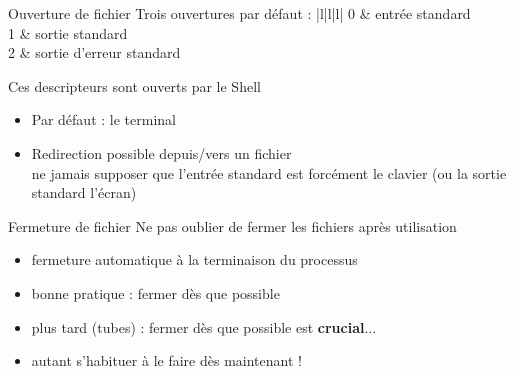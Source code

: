 \begin {frame} {Ouverture de fichier}
    Trois ouvertures par défaut :
    \ctableau {} {|l|l|l|} {
	0 & entrée standard \\
	1 & sortie standard \\
	2 & sortie d'erreur standard \\
    }

    \vspace* {3mm}
    Ces descripteurs sont ouverts par le Shell
    \begin {itemize}
	\item Par défaut : le terminal
	\item Redirection possible depuis/vers un fichier
	    \\
	    \implique ne jamais supposer que l'entrée standard est
	    forcément le clavier (ou la sortie standard l'écran)
    \end {itemize}
\end {frame}

\begin {frame} {Fermeture de fichier}
    Ne pas oublier de fermer les fichiers après utilisation

    \begin {itemize}
	\item fermeture automatique à la terminaison du processus
	\item bonne pratique : fermer dès que possible
	\item plus tard (tubes) : fermer dès que possible est \textbf
	    {crucial}...
	\item autant s'habituer à le faire dès maintenant !

    \end {itemize}
\end {frame}

